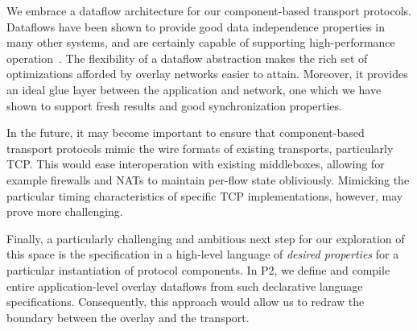 We embrace a dataflow architecture for our component-based transport
protocols.  Dataflows have been shown to provide good
data independence properties in many other systems, and are certainly
capable of supporting high-performance
operation~\cite{BrewerInktomi}. The flexibility of a
dataflow abstraction makes the rich set of optimizations afforded by
overlay networks easier to attain. Moreover, it provides an ideal glue
layer between the application and network, one which we have shown to
support fresh results and good synchronization properties. 

In the future, it may become important to ensure that component-based
transport 
protocols mimic the wire formats of existing transports, particularly
TCP.  This would ease interoperation with existing middleboxes, allowing
for example firewalls and NATs to maintain per-flow state obliviously.
Mimicking the particular timing characteristics of specific TCP
implementations, however, may prove more challenging.

Finally, a particularly challenging and ambitious next step for our exploration of this space
is the specification in a high-level language of \emph{desired properties}
for a particular instantiation of protocol components.  In P2, we define
and compile entire
application-level overlay dataflows from such declarative language specifications.
Consequently, this approach would allow us to redraw the
boundary between the overlay and the transport.
